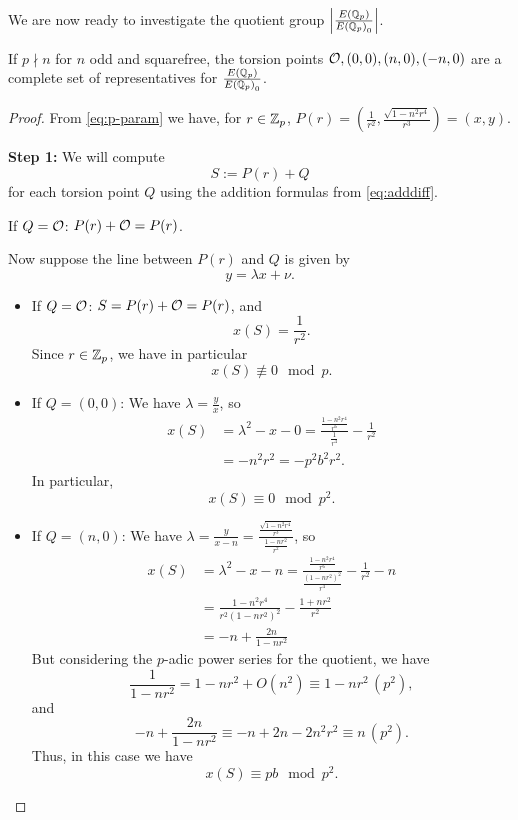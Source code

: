 \documentclass[12pt, a4paper]{report}
\begin{document}
We are now ready to investigate the quotient group $\left| \frac{{E({\mathbb Q}_p)}}{{E({\mathbb Q}_p)}_0}
\right|$.

\begin{thm}
  If $p \nmid n$ for $n$ odd and squarefree, the torsion points ${\mathcal O}, (0,0), (n,0), (-n,0)$
  are a complete set of representatives for $\frac{{E({\mathbb Q}_p)}}{{E({\mathbb Q}_p)}_0}$.
\end{thm}
\begin{proof}
  From \autoref{eq:p-param} we have, for $r \in {\mathbb Z}_p$,
  $P(r) = (\frac{1}{r^2}, \frac{\sqrt{1-n^2r^4}}{r^3}) = (x,y)$.

  \textbf{Step 1:} We will compute $$S := P(r) + Q$$ for each torsion point $Q$ using
  the addition formulas from \autoref{eq:adddiff}.
   
  If $Q = {\mathcal O}$: $P(r) + {\mathcal O} = P(r)$.

  Now suppose the line between $P(r)$ and $Q$ is given by
  \[y = \lambda x + \nu.\]

  \begin{itemize}
    
  \item If $Q = {\mathcal O}$: $S = P(r) + {\mathcal O} = P(r)$, and
    \[x(S) = \frac{1}{r^2}.\]
    Since $r \in {\mathbb Z}_p$, we have in particular
    \[x(S) \not\equiv 0 \mod{p}.\]
    
  \item If $Q = (0,0)$:
  We have $\lambda = \frac{y}{x}$, so
  \begin{equation*}
    \begin{split}
      x(S)
      &= \lambda^2 - x - 0 =
      \frac{\frac{1 - n^2r^4}{r^6}}{\frac{1}{r^4}} - \frac{1}{r^2} \\
      &= -n^2r^2 = -p^2b^2r^2.
    \end{split}
  \end{equation*}
  In particular, 
  \[x(S) \equiv 0 \mod{p^2}.\]
  
\item If $Q = (n, 0)$: We have $\lambda = \frac{y}{x-n} =
  \frac{\frac{\sqrt{1-n^2r^4}}{r^3}}{\frac{1-nr^2}{r^2}}$, so
  \begin{equation*}
    \begin{split}
      x(S)
      &= \lambda^2 - x - n = 
      \frac{\frac{1 - n^2r^4}{r^6}}{\frac{(1-nr^2)^2}{r^4}} -
      \frac{1}{r^2} - n \\
      &= \frac{1-n^2r^4}{r^2(1-nr^2)^2} - \frac{1+nr^2}{r^2} \\
      &= -n + \frac{2n}{1-nr^2}
    \end{split}
  \end{equation*}
  But considering the $p$-adic power series for the quotient, we have
  \[\frac{1}{1-nr^2} = 1 - nr^2 + O(n^2) \equiv 1-nr^2 \, (p^2),\] and 
  \[-n + \frac{2n}{1-nr^2} \equiv -n + 2n - 2n^2r^2 \equiv n \, (p^2).\]
  Thus, in this case we have
  \[x(S) \equiv pb \mod{p^2}.\]


\end{itemize}
\end{proof}
\end{document}
